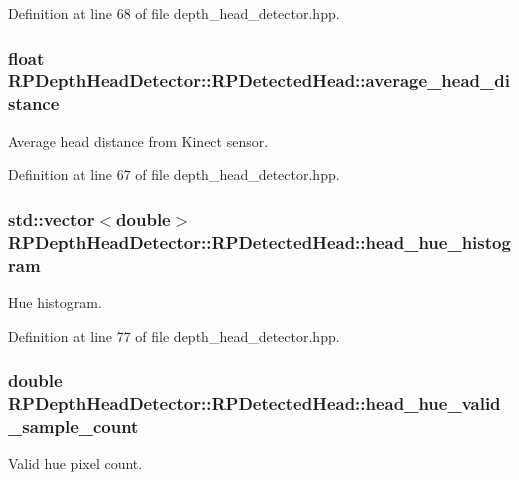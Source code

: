 \-Definition at line 68 of file depth\-\_\-head\-\_\-detector.\-hpp.

\hypertarget{struct_r_p_depth_head_detector_1_1_r_p_detected_head_a92be67447e859e5abd7dfa8c7b10d0db}{
\subsubsection[{average\-\_\-head\-\_\-distance}]{\setlength{\rightskip}{0pt plus 5cm}float {\bf \-R\-P\-Depth\-Head\-Detector\-::\-R\-P\-Detected\-Head\-::average\-\_\-head\-\_\-distance}}}\label{struct_r_p_depth_head_detector_1_1_r_p_detected_head_a92be67447e859e5abd7dfa8c7b10d0db}
\-Average head distance from \-Kinect sensor. 

\-Definition at line 67 of file depth\-\_\-head\-\_\-detector.\-hpp.

\hypertarget{struct_r_p_depth_head_detector_1_1_r_p_detected_head_ac5b498728e120762489f784a9ad46d9e}{
\subsubsection[{head\-\_\-hue\-\_\-histogram}]{\setlength{\rightskip}{0pt plus 5cm}std\-::vector$<$double$>$ {\bf \-R\-P\-Depth\-Head\-Detector\-::\-R\-P\-Detected\-Head\-::head\-\_\-hue\-\_\-histogram}}}\label{struct_r_p_depth_head_detector_1_1_r_p_detected_head_ac5b498728e120762489f784a9ad46d9e}
\-Hue histogram. 

\-Definition at line 77 of file depth\-\_\-head\-\_\-detector.\-hpp.

\hypertarget{struct_r_p_depth_head_detector_1_1_r_p_detected_head_aab08a511d1bcda0c0ad0483abac1b33a}{
\subsubsection[{head\-\_\-hue\-\_\-valid\-\_\-sample\-\_\-count}]{\setlength{\rightskip}{0pt plus 5cm}double {\bf \-R\-P\-Depth\-Head\-Detector\-::\-R\-P\-Detected\-Head\-::head\-\_\-hue\-\_\-valid\-\_\-sample\-\_\-count}}}\label{struct_r_p_depth_head_detector_1_1_r_p_detected_head_aab08a511d1bcda0c0ad0483abac1b33a}
\-Valid hue pixel count. 

